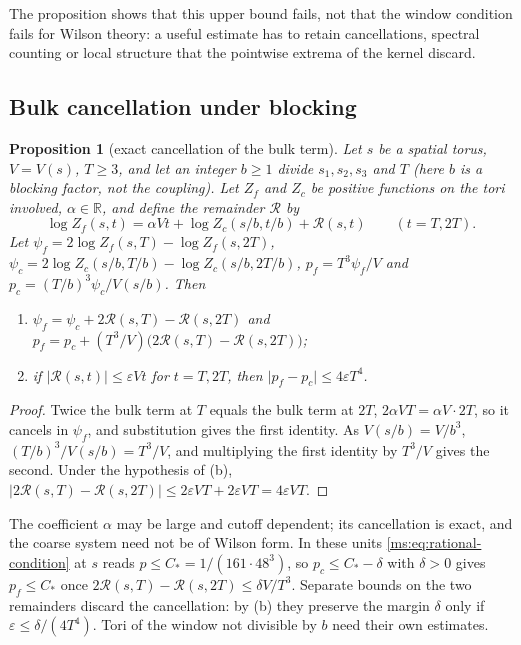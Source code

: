 \documentclass[11pt,a4paper]{amsart}
\newtheorem{proposition}[theorem]{Proposition}
\theoremstyle{definition}
\theoremstyle{remark}
\numberwithin{equation}{section}
\newcommand{\R}{\mathbb{R}}          %
\newcommand{\abs}[1]{\lvert #1\rvert}      %
\newcommand{\Vol}[1]{V(#1)}                %
\begin{document}
The proposition shows that this upper bound fails, not that the window condition fails for Wilson theory: a useful estimate has to retain cancellations, spectral counting or local structure that the pointwise extrema of the kernel discard.

\subsection{Bulk cancellation under blocking}

\begin{proposition}[exact cancellation of the bulk term]\label{ms:prop:RG-defect}
Let $s$ be a spatial torus, $V=\Vol{s}$, $T\ge3$, and let an integer $b\ge1$ divide $s_1,s_2,s_3$ and $T$ \textup{(}here $b$ is a blocking factor, not the coupling\textup{)}. Let $Z_f$ and $Z_c$ be positive functions on the tori involved, $\alpha\in\R$, and define the remainder $\mathcal R$ by
\[
\log Z_f(s,t)=\alpha Vt+\log Z_c(s/b,t/b)+\mathcal R(s,t)\qquad(t=T,2T).
\]
Let $\psi_f=2\log Z_f(s,T)-\log Z_f(s,2T)$, $\psi_c=2\log Z_c(s/b,T/b)-\log Z_c(s/b,2T/b)$, $p_f=T^3\psi_f/V$ and $p_c=(T/b)^3\psi_c/\Vol{s/b}$. Then
\begin{enumerate}[label=(\alph*)]
\item $\psi_f=\psi_c+2\mathcal R(s,T)-\mathcal R(s,2T)$ and $p_f=p_c+(T^3/V)\bigl(2\mathcal R(s,T)-\mathcal R(s,2T)\bigr)$;
\item if $\abs{\mathcal R(s,t)}\le\varepsilon Vt$ for $t=T,2T$, then $\abs{p_f-p_c}\le4\varepsilon T^4$.
\end{enumerate}
\end{proposition}

\begin{proof}
Twice the bulk term at $T$ equals the bulk term at $2T$, $2\alpha VT=\alpha V\cdot2T$, so it cancels in $\psi_f$, and substitution gives the first identity. As $\Vol{s/b}=V/b^3$, $(T/b)^3/\Vol{s/b}=T^3/V$, and multiplying the first identity by $T^3/V$ gives the second. Under the hypothesis of (b), $\abs{2\mathcal R(s,T)-\mathcal R(s,2T)}\le2\varepsilon VT+2\varepsilon VT=4\varepsilon VT$.
\end{proof}

The coefficient $\alpha$ may be large and cutoff dependent; its cancellation is exact, and the coarse system need not be of Wilson form. In these units \eqref{ms:eq:rational-condition} at $s$ reads $p\le C_*=1/(161\cdot48^3)$, so $p_c\le C_*-\delta$ with $\delta>0$ gives $p_f\le C_*$ once $2\mathcal R(s,T)-\mathcal R(s,2T)\le\delta V/T^3$. Separate bounds on the two remainders discard the cancellation: by (b) they preserve the margin $\delta$ only if $\varepsilon\le\delta/(4T^4)$. Tori of the window not divisible by $b$ need their own estimates.
\end{document}
